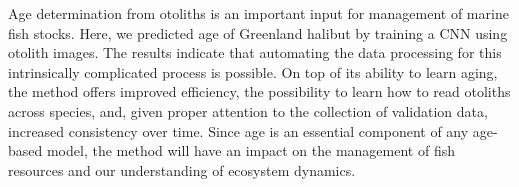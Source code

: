 \documentclass[10pt,letterpaper]{article}
\begin{document}
Age determination from otoliths is an important input for management of marine fish stocks. Here, we predicted age of Greenland halibut by training a CNN using otolith images. The results indicate that automating the data processing for this intrinsically complicated process is possible. On top of its ability to learn aging, the method offers improved efficiency, the possibility to learn how to read otoliths across species, and, given proper attention to the collection of validation data, increased consistency over time. Since age is an essential component of any age-based model, the method will have an impact on the management of fish resources and our understanding of ecosystem dynamics.


\end{document}
